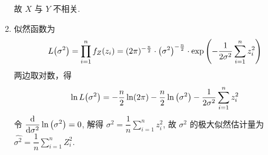 \begin{solution}
\begin{enumerate}[label=(\arabic{*})]
$$              $$
              故 $X$ 与 $Y$ 不相关.
        \item 似然函数为
              $$
                  L\qty(\sigma^2)=\prod_{i=1}^{n} f_Z(z_i)=(2\pi)^{-\frac{n}{2}}\cdot \qty(\sigma^2)^{-\frac{n}{2}}\cdot\exp\qty(-\dfrac{1}{2\sigma^2}\sum_{i=1}^{n} z_i^2)
              $$
              两边取对数，得
              $$
                  \ln L\qty(\sigma^2)=-\dfrac{n}{2}\ln (2\pi) -\dfrac{n}{2}\ln\qty(\sigma^2) -\dfrac{1}{2\sigma^2}\sum_{i=1}^{n} z_i^2
              $$
              令 $\displaystyle \dv{\sigma^2}\ln\qty(\sigma^2)=0$, 解得 $\sigma^2=\dfrac{1}{n}\displaystyle \sum_{i=1}^{n} z_i^2$, 故 $\sigma^2$ 的极大似然估计量为 $\hat{\sigma^2}=\dfrac{1}{n}\displaystyle \sum_{i=1}^{n} Z_i^2.$
    \end{enumerate}
\end{solution}